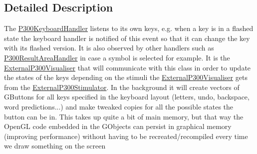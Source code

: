 \subsection{Detailed Description}
The \hyperlink{classOpenViBEApplications_1_1P300KeyboardHandler}{P300KeyboardHandler} listens to its own keys, e.g. when a key is in a flashed state the keyboard handler is notified of this event so that it can change the key with its flashed version. It is also observed by other handlers such as \hyperlink{classOpenViBEApplications_1_1P300ResultAreaHandler}{P300ResultAreaHandler} in case a symbol is selected for example. It is the \hyperlink{classOpenViBEApplications_1_1ExternalP300Visualiser}{ExternalP300Visualiser} that will communicate with this class in order to update the states of the keys depending on the stimuli the \hyperlink{classOpenViBEApplications_1_1ExternalP300Visualiser}{ExternalP300Visualiser} gets from the \hyperlink{classOpenViBEApplications_1_1ExternalP300Stimulator}{ExternalP300Stimulator}. In the background it will create vectors of GButtons for all keys specified in the keyboard layout (letters, undo, backspace, word predictions...) and make tweaked copies for all the possible states the button can be in. This takes up quite a bit of main memory, but that way the OpenGL code embedded in the GObjects can persist in graphical memory (improving performance) without having to be recreated/recompiled every time we draw something on the screen 

